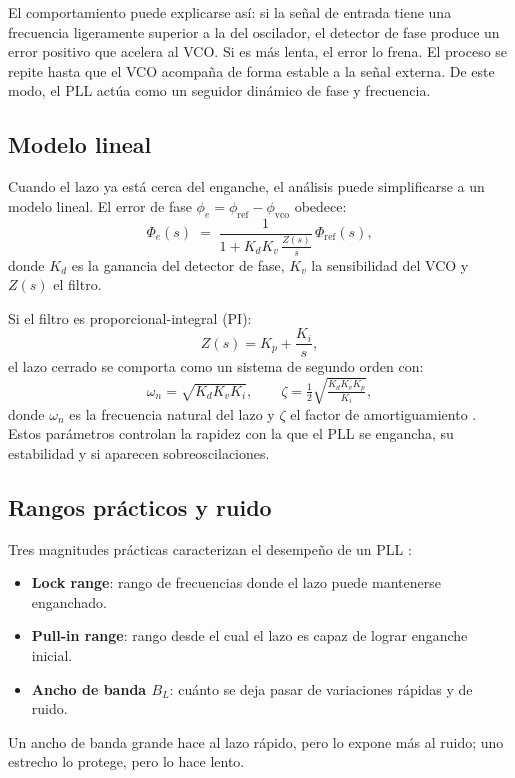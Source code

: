 El comportamiento puede explicarse así:  
si la señal de entrada tiene una frecuencia ligeramente superior a la del oscilador, 
el detector de fase produce un error positivo que acelera al VCO.  
Si es más lenta, el error lo frena.  
El proceso se repite hasta que el VCO acompaña de forma estable a la señal externa.  
De este modo, el PLL actúa como un seguidor dinámico de fase y frecuencia.
\balance
\subsection{Modelo lineal}

Cuando el lazo ya está cerca del enganche, el análisis puede simplificarse a un modelo lineal.  
El error de fase $\phi_e = \phi_{\text{ref}} - \phi_{\text{vco}}$ obedece:
\begin{equation}
	\Phi_e(s) \;=\; \frac{1}{1 + K_d K_v \, \tfrac{Z(s)}{s}}\, \Phi_{\text{ref}}(s),
\end{equation}
donde $K_d$ es la ganancia del detector de fase, $K_v$ la sensibilidad del VCO y $Z(s)$ el filtro.  

Si el filtro es proporcional-integral (PI):
\begin{equation}
	Z(s) = K_p + \frac{K_i}{s},
\end{equation}
el lazo cerrado se comporta como un sistema de segundo orden con:
\[
\omega_n = \sqrt{K_d K_v K_i}, \qquad 
\zeta = \tfrac{1}{2}\sqrt{\tfrac{K_d K_v K_p}{K_i}},
\]
donde $\omega_n$ es la frecuencia natural del lazo y $\zeta$ el factor de amortiguamiento 
\cite{Collins2018,ADI_MT086}.  
Estos parámetros controlan la rapidez con la que el PLL se engancha, su estabilidad y si aparecen sobreoscilaciones.

\subsection{Rangos prácticos y ruido}

Tres magnitudes prácticas caracterizan el desempeño de un PLL \cite{Collins2018}:
\begin{itemize}
	\item \textbf{Lock range}: rango de frecuencias donde el lazo puede mantenerse enganchado.  
	\item \textbf{Pull-in range}: rango desde el cual el lazo es capaz de lograr enganche inicial.  
	\item \textbf{Ancho de banda $B_L$}: cuánto se deja pasar de variaciones rápidas y de ruido.
\end{itemize}
Un ancho de banda grande hace al lazo rápido, pero lo expone más al ruido; 
uno estrecho lo protege, pero lo hace lento.

